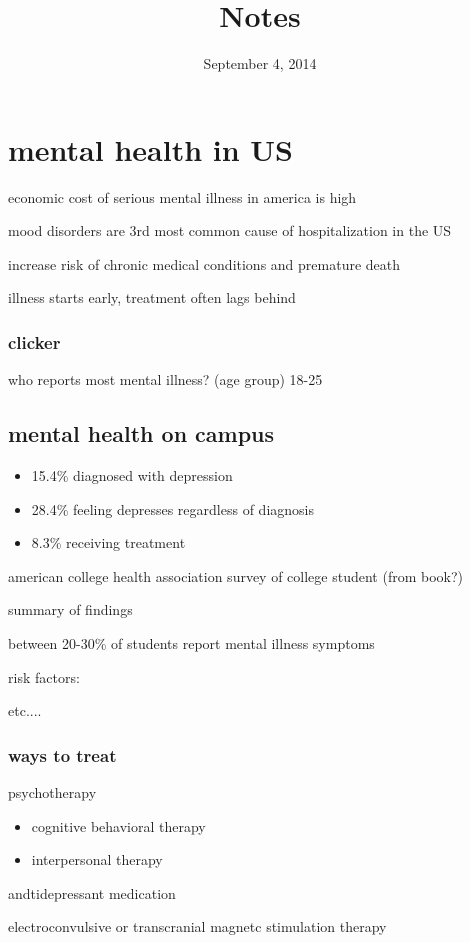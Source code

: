 \documentclass[letterpaper]{article}
\begin{document}
\title{Notes}
\date{September 4, 2014}
\maketitle

\section*{mental health in US}
economic cost of serious mental illness in america is high

mood disorders are 3rd most common cause of hospitalization in the US

increase risk of chronic medical conditions and premature death

illness starts early, treatment often lags behind
\subsubsection*{clicker}
who reports most mental illness? (age group) 18-25

\subsection*{mental health on campus}
\begin{itemize}
\item
15.4\% diagnosed with depression
\item
28.4\% feeling depresses regardless of diagnosis
\item
8.3\% receiving treatment
\end{itemize}

american college health association survey of college student (from book?)


summary of findings

between 20-30\% of students report mental illness symptoms

risk factors:

etc....

\subsubsection*{ways to treat}
psychotherapy
\begin{itemize}
\item
cognitive behavioral therapy
\item
interpersonal therapy
\end{itemize}
andtidepressant medication

electroconvulsive or transcranial magnetc stimulation therapy
\end{document}
